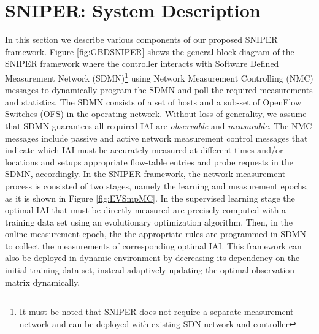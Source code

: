 \section{SNIPER: System Description}  \label{sec:SNIPERSysDsc}
In this section we describe various components of our proposed SNIPER
framework. Figure \ref{fig:GBDSNIPER} shows the general block diagram
of the SNIPER framework where the controller interacts with Software
Defined Measurement Network (SDMN)\footnote{It must be noted that
  SNIPER does not require a separate measurement network and can be
  deployed with existing SDN-network and controller} using Network
Measurement Controlling (NMC) messages to dynamically program the SDMN
and poll the required measurements and statistics. The SDMN consists
of a set of hosts and a sub-set of OpenFlow Switches (OFS) in the
operating network. Without loss of generality, we assume that SDMN
guarantees all required IAI are \emph{observable} and
\emph{measurable}. The NMC messages include passive and active network
measurement control messages that indicate which IAI must be
accurately measured at different times and/or locations and setups
appropriate flow-table entries and probe requests in the SDMN,
accordingly. In the SNIPER framework, the network measurement process
is consisted of two stages, namely the learning and measurement
epochs, as it is shown in Figure \ref{fig:EVSmpMC}. In the supervised
learning stage the optimal IAI that must be directly measured are
precisely computed with a training data set using an evolutionary
optimization algorithm. Then, in the online measurement epoch, the the
appropriate rules are programmed in SDMN to collect the measurements
of corresponding optimal IAI. This framework can also be deployed in
dynamic environment by decreasing its dependency on the initial
training data set, instead adaptively updating the optimal observation
matrix dynamically.

